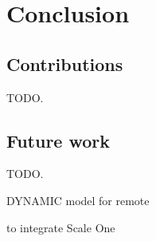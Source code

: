 \chapter*{Conclusion}
\mtcaddchapter[Conclusion]

\section*{Contributions}
TODO.

\section*{Future work}
TODO.

DYNAMIC model for remote

to integrate Scale One
